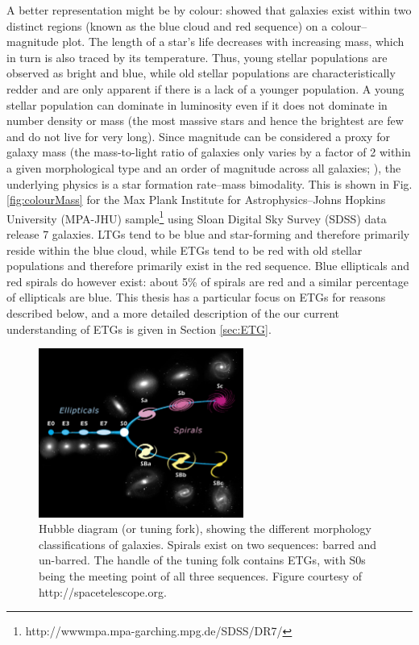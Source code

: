 	A better representation might be by colour: \citet{Baldry2004} showed that galaxies exist within two distinct regions (known as the blue cloud and red sequence) on a colour--magnitude plot. The length of a star's life decreases with increasing mass, which in turn is also traced by its temperature. Thus, young stellar populations are observed as bright and blue, while old stellar populations are characteristically redder and are only apparent if there is a lack of a younger population. A young stellar population can dominate in luminosity even if it does not dominate in number density or mass (the most massive stars and hence the brightest are few and do not live for very long). Since magnitude can be considered a proxy for galaxy mass (the mass-to-light ratio of galaxies only varies by a factor of 2 within a given morphological type and an order of magnitude across all galaxies; \citealt{Faber1979}), the underlying physics is a star formation rate--mass bimodality. This is shown in Fig. \ref{fig:colourMass} for the Max Plank Institute for Astrophysics--Johns Hopkins University (MPA-JHU) sample\footnote{http://wwwmpa.mpa-garching.mpg.de/SDSS/DR7/} using Sloan Digital Sky Survey (SDSS) data release 7 galaxies. LTGs tend to be blue and star-forming and therefore primarily reside within the blue cloud, while ETGs tend to be red with old stellar populations and therefore primarily exist in the red sequence. Blue ellipticals and red spirals do however exist: about 5\% of spirals are red \citep{Masters2010} and a similar percentage of ellipticals are blue\citep{Schawinski2009}. This thesis has a particular focus on ETGs for reasons described below, and a more detailed description of the our current understanding of ETGs is given in Section \ref{sec:ETG}. 

	\begin{figure}
		\centering
		\includegraphics[width=0.6\textwidth]{introduction/hubble.jpg}
		\caption[The Hubble tuning-fork]{Hubble diagram (or tuning fork), showing the different morphology classifications of galaxies. Spirals exist on two sequences: barred and un-barred. The handle of the tuning folk contains ETGs, with S0s being the meeting point of all three sequences. Figure courtesy of http://spacetelescope.org.}
		\label{fig:Hubble}
	\end{figure}

